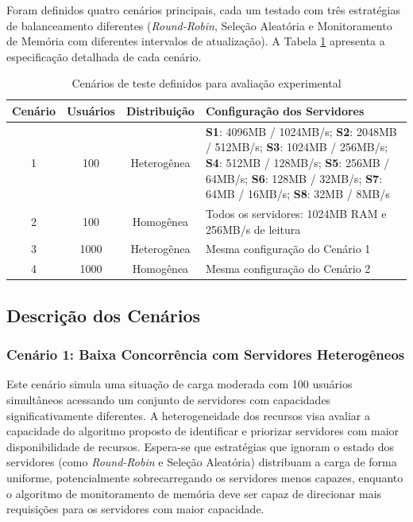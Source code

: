 Foram definidos quatro cenários principais, cada um testado com três estratégias de balanceamento diferentes (\textit{Round-Robin}, Seleção Aleatória e Monitoramento de Memória com diferentes intervalos de atualização). A Tabela \ref{tab:test-scenarios} apresenta a especificação detalhada de cada cenário.

\begin{table}[htbp]
\centering
\caption{Cenários de teste definidos para avaliação experimental}
\label{tab:test-scenarios}
\small
\begin{tabular}{|c|c|c|p{6.5cm}|}
\hline
\textbf{Cenário} & \textbf{Usuários} & \textbf{Distribuição} & \textbf{Configuração dos Servidores} \\
\hline
1 & 100 & Heterogênea & 
\textbf{S1}: 4096MB / 1024MB/s; \newline
\textbf{S2}: 2048MB / 512MB/s; \newline
\textbf{S3}: 1024MB / 256MB/s; \newline
\textbf{S4}: 512MB / 128MB/s; \newline
\textbf{S5}: 256MB / 64MB/s; \newline
\textbf{S6}: 128MB / 32MB/s; \newline
\textbf{S7}: 64MB / 16MB/s; \newline
\textbf{S8}: 32MB / 8MB/s \\
\hline
2 & 100 & Homogênea & 
Todos os servidores: 1024MB RAM e 256MB/s de leitura \\
\hline
3 & 1000 & Heterogênea & 
Mesma configuração do Cenário 1 \\
\hline
4 & 1000 & Homogênea & 
Mesma configuração do Cenário 2 \\
\hline
\end{tabular}
\end{table}

\subsection{Descrição dos Cenários}

\subsubsection{Cenário 1: Baixa Concorrência com Servidores Heterogêneos}

Este cenário simula uma situação de carga moderada com 100 usuários simultâneos acessando um conjunto de servidores com capacidades significativamente diferentes. A heterogeneidade dos recursos visa avaliar a capacidade do algoritmo proposto de identificar e priorizar servidores com maior disponibilidade de recursos. Espera-se que estratégias que ignoram o estado dos servidores (como \textit{Round-Robin} e Seleção Aleatória) distribuam a carga de forma uniforme, potencialmente sobrecarregando os servidores menos capazes, enquanto o algoritmo de monitoramento de memória deve ser capaz de direcionar mais requisições para os servidores com maior capacidade.

